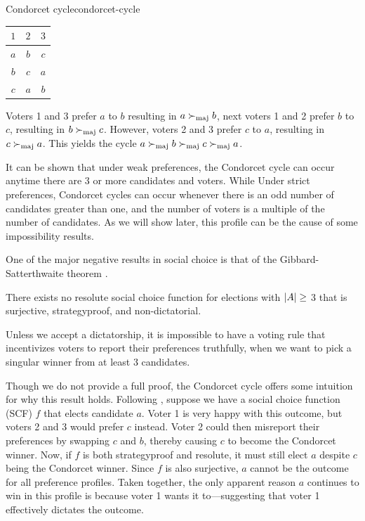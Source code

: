 \begin{example}{Condorcet cycle}{condorcet-cycle}
	\begin{minipage}{0.15\linewidth}
		\begin{tabular}{ccc}
			\toprule
			$1$ & $2$ & $3$  \\
			\midrule
			$a$ & $b$ & $c $ \\
			$b$ & $c$ & $a $ \\
			$c$ & $a$ & $b $ \\
			\bottomrule
		\end{tabular}
	\end{minipage}
	\hspace{0.02\linewidth}
	\begin{minipage}{0.78\linewidth}
		Voters 1 and 3  prefer $a$ to $b$ resulting in $a \succ_{\textnormal{maj}} b$,
		next voters 1 and 2 prefer $b$ to $c$, resulting in $b \succ_{\textnormal{maj}}
			c$. However, voters 2 and 3 prefer $c$ to $a$, resulting in $c
			\succ_{\textnormal{maj}} a$. This yields the cycle $a \succ_{\textnormal{maj}} b \succ_{\textnormal{maj}} c
			\succ_{\textnormal{maj}} a$.
	\end{minipage}
\end{example}

It can be shown that under weak preferences, the Condorcet cycle can occur
anytime there are 3 or more candidates and voters. While Under strict
preferences, Condorcet cycles can occur whenever there is an odd number of
candidates greater than one, and the number of voters is a multiple of the
number of candidates. As we will show later, this profile can be the cause of
some impossibility results.

One of the major negative results in social choice is that of the
Gibbard-Satterthwaite theorem
\citep{gibbardManipulationVotingSchemes1973,satterthwaiteStrategyproofnessArrowsConditions1975}.

\begin{theorem}
	\label{thm:gs-thm}
	There exists no resolute social choice function for elections with $|A| \geq$ 3 that is surjective, strategyproof, and non-dictatorial.
\end{theorem}

Unless we accept a dictatorship, it is impossible to have a voting
rule that incentivizes voters to report their preferences truthfully, when we
want to pick a singular winner from at least 3 candidates.

Though we do not provide a full proof, the Condorcet cycle offers some intuition
for why this result holds. Following , suppose we have
a social choice function (SCF) $f$ that elects candidate $a$. Voter 1 is very
happy with this outcome, but voters 2 and 3 would prefer $c$ instead. Voter 2
could then misreport their preferences by swapping $c$ and $b$, thereby causing
$c$ to become the Condorcet winner. Now, if $f$ is both strategyproof and
resolute, it must still elect $a$ despite $c$ being the Condorcet winner. Since
$f$ is also surjective, $a$ cannot be the outcome for all preference profiles.
Taken together, the only apparent reason $a$ continues to win in this profile is
because voter 1 wants it to—suggesting that voter 1 effectively dictates the
outcome.

